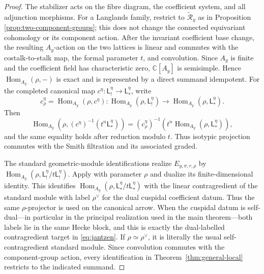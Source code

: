 \documentclass[10pt,a4paper]{amsart}
\begin{document}
\begin{proof}
The stabilizer acts on the fibre diagram, the coefficient system, and all
adjunction morphisms.  For a Langlands family, restrict to
$\widetilde{\mathcal R}_y$ as in Proposition
\ref{prop:two-component-groups}; this does not change the connected
equivariant cohomology or its component action.  After the invariant
coefficient base change, the resulting
$A_y$-action on the two lattices is linear and commutes
with the costalk-to-stalk map, the formal parameter $t$, and
convolution.  Since $A_y$ is finite and the coefficient field has
characteristic zero, $\mathbb C[A_y]$ is semisimple.  Hence
$\operatorname{Hom}_{A_y}(\rho,-)$ is exact and is represented by a direct
summand idempotent.  For the completed canonical map
$c^\eta:\mathsf L_!^\eta\to\mathsf L_*^\eta$, write
\[
 c_\rho^\eta=\operatorname{Hom}_{A_y}(\rho,c^\eta):
 \operatorname{Hom}_{A_y}(\rho,\mathsf L_!^\eta)
 \longrightarrow
 \operatorname{Hom}_{A_y}(\rho,\mathsf L_*^\eta).
\]
Then
\[
 \operatorname{Hom}_{A_y}\!\left(
  \rho,(c^\eta)^{-1}(t^n\mathsf L_*^\eta)\right)
 =(c_\rho^\eta)^{-1}\!\left(t^n
   \operatorname{Hom}_{A_y}(\rho,\mathsf L_*^\eta)\right),
\]
and the same equality holds after reduction modulo $t$.
Thus isotypic projection commutes with the Smith filtration and its
associated graded.

The standard geometric-module identifications realize
$E_{y,\sigma,r,\rho}$ by
$\operatorname{Hom}_{A_y}(\rho,\mathsf L_!^\eta/t\mathsf L_!^\eta)$.  Apply
\cite[Theorem~C(b)]{Solleveld} with parameter $\rho$ and dualize its
finite-dimensional identity.  This identifies
$\operatorname{Hom}_{A_y}(\rho,
 \mathsf L_*^\eta/t\mathsf L_*^\eta)$ with the linear contragredient of the
standard module with label $\rho^\vee$ for the dual cuspidal coefficient
datum.
Thus the same $\rho$-projector is used on the canonical arrow.  When the
cuspidal datum is self-dual---in particular in the principal realization
used in the main theorem---both labels lie in the same Hecke block, and this
is exactly the dual-labelled contragredient target in
\eqref{eq:jantzen}.  If $\rho\simeq\rho^\vee$, it is literally the usual
self-contragredient standard module.
Since convolution commutes with the component-group action, every
identification in Theorem~\ref{thm:general-local} restricts to the indicated
summand.
\end{proof}
\end{document}
